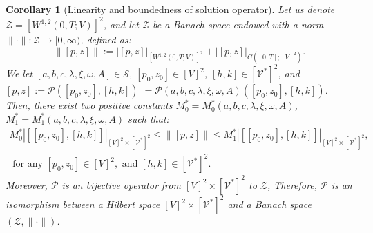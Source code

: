 \documentclass{sinst}
\numberwithin{equation}{section}
\theoremstyle{plain}
\newtheorem{cor}{Corollary}%
\theoremstyle{definition}
\def\sP{\mathscr{P}}
\def\sS{\mathscr{S}}
\def\sV{\mathscr{V}}
\def\sZ{\mathscr{Z}}
\begin{document}
\begin{cor}[Linearity and boundedness of solution operator] \label{cor_bddness}
  Let us denote 
  \\
  $\sZ = [W^{1,2}(0,T;V)]^2$, and let $\sZ$ be a Banach space endowed with a norm $\| \cdot \|: \sZ \longrightarrow [0,\infty)$, defined as:
    \begin{equation}
      \| [p,z] \| := |[p,z]|_{[W^{1,2}(0,T;V)]^2} + |[p,z]|_{C([0,T];[V]^2)}.
    \end{equation}
    We let $[a,b,c,\lambda,\xi,\omega,A] \in \sS$, $[p_0, z_0] \in [V]^2$, $[h,k] \in [\sV^*]^2$, and $[p,z] := \sP([p_0,z_0],[h,k])$ $= \sP(a,b,c,\lambda,\xi,\omega,A)([p_0,z_0],[h,k])$. Then, there exist two positive constants $M_0^* = M_0^*(a,b,c,\lambda,\xi,\omega,A)$, $M_1^* = M_1^*(a,b,c,\lambda,\xi,\omega,A)$ such that:
    \begin{gather}
      M_0^* |[[p_0,z_0],[h,k]]|_{[V]^2 \times [\sV^*]^2} \leq \|[p,z]\| \leq M_1^* |[[p_0,z_0],[h,k]]|_{[V]^2 \times [\sV^*]^2}, 
      \\
      \mbox{ for any } [p_0, z_0] \in [V]^2, \mbox{ and } [h,k] \in [\sV^*]^2. \label{sP_bdd}
    \end{gather}
    Moreover, $\sP$ is an bijective operator from $[V]^2 \times [\sV^*]^2$ to $\sZ$, Therefore, $\sP$ is an isomorphism between a Hilbert space $[V]^2 \times [\sV^*]^2$ and a Banach space $(\sZ, \| \cdot \|)$.
\end{cor}
\end{document}

